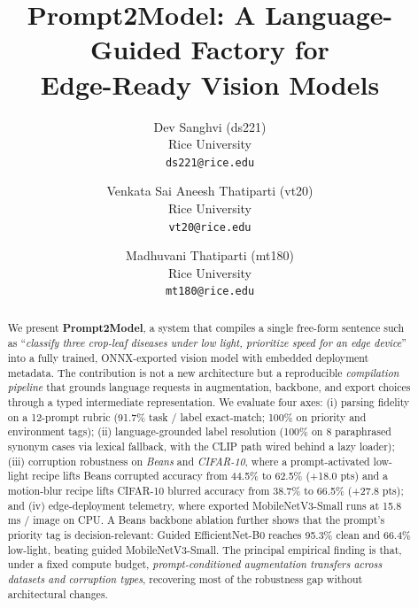 \documentclass[10pt,twocolumn,letterpaper]{article}
\begin{document}
\title{Prompt2Model: A Language-Guided Factory for \\ Edge-Ready Vision Models}

\author{
    Dev Sanghvi (ds221) \\ Rice University \\ {\tt\small ds221@rice.edu}
    \and
    Venkata Sai Aneesh Thatiparti (vt20) \\ Rice University \\ {\tt\small vt20@rice.edu}
    \and
    Madhuvani Thatiparti (mt180) \\ Rice University \\ {\tt\small mt180@rice.edu}
}

\maketitle

\begin{abstract}
    We present \textbf{Prompt2Model}, a system that compiles a single
    free-form sentence such as ``\emph{classify three crop-leaf diseases under
        low light, prioritize speed for an edge device}'' into a fully trained,
    ONNX-exported vision model with embedded deployment metadata.
    The contribution is not a new architecture but a reproducible
    \emph{compilation pipeline} that grounds language requests in
    augmentation, backbone, and export choices through a typed intermediate
    representation. We evaluate four axes:
    (i) parsing fidelity on a 12-prompt rubric (91.7\% task / label
    exact-match; 100\% on priority and environment tags);
    (ii) language-grounded label resolution (100\% on 8 paraphrased
    synonym cases via lexical fallback, with the CLIP path wired
    behind a lazy loader);
    (iii) corruption robustness on \emph{Beans} and \emph{CIFAR-10}, where
    a prompt-activated low-light recipe lifts Beans corrupted accuracy
    from 44.5\% to 62.5\% (+18.0 pts) and a motion-blur recipe lifts
    CIFAR-10 blurred accuracy from 38.7\% to 66.5\% (+27.8 pts); and
    (iv) edge-deployment telemetry, where exported MobileNetV3-Small runs
    at 15.8\,ms / image on CPU. A Beans backbone ablation further shows
    that the prompt's priority tag is decision-relevant: Guided
    EfficientNet-B0 reaches 95.3\% clean and 66.4\% low-light, beating
    guided MobileNetV3-Small. The principal empirical finding is that, under a fixed compute budget,
    \emph{prompt-conditioned augmentation transfers across
        datasets and corruption types}, recovering most of the robustness gap
    without architectural changes.
\end{abstract}
\end{document}
